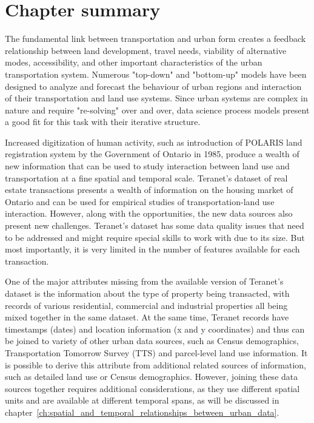 \section{Chapter summary} \label{sec:background_summary}

The fundamental link between transportation and urban form creates a feedback relationship between land development, travel needs, viability of alternative modes, accessibility, and other important characteristics of the urban transportation system.
Numerous "top-down" and "bottom-up" models have been designed to analyze and forecast the behaviour of urban regions and interaction of their transportation and land use systems.
Since urban systems are complex in nature and require "re-solving" over and over, data science process models present a good fit for this task with their iterative structure.

Increased digitization of human activity, such as introduction of POLARIS land registration system by the Government of Ontario in 1985, produce a wealth of new information that can be used to study interaction between land use and transportation at a fine spatial and temporal scale.
Teranet's dataset of real estate transactions presents a wealth of information on the housing market of Ontario and can be used for empirical studies of transportation-land use interaction.
However, along with the opportunities, the new data sources also present new challenges.
Teranet's dataset has some data quality issues that need to be addressed and might require special skills to work with due to its size.
But most importantly, it is very limited in the number of features available for each transaction.

One of the major attributes missing from the available version of Teranet's dataset is the information about the type of property being transacted, with records of various residential, commercial and industrial properties all being mixed together in the same dataset.
At the same time, Teranet records have timestamps (dates) and location information (x and y coordinates) and thus can be joined to variety of other urban data sources, such as Census demographics, Transportation Tomorrow Survey (TTS) and parcel-level land use information.
It is possible to derive this attribute from additional related sources of information, such as detailed land use or Census demographics.
However, joining these data sources together requires additional considerations, as they use different spatial units and are available at different temporal spans, as will be discussed in chapter~\ref{ch:spatial_and_temporal_relationships_between_urban_data}.
